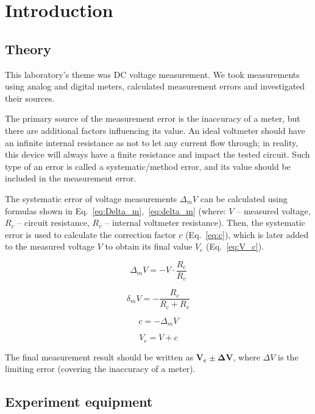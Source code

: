 \section{Introduction}

\subsection{Theory}

This laboratory's theme was DC voltage measurement. We took measurements using analog and digital meters, calculated measurement errors and investigated their sources.

The primary source of the measurement error is the inaccuracy of a meter, but there are additional factors influencing its value. An ideal voltmeter should have an infinite internal resistance as not to let any current flow through; in reality, this device will always have a finite resistance and impact the tested circuit. Such type of an error is called a systematic/method error, and its value should be included in the measurement error.

The systematic error of voltage measurements $\Delta_m V$ can be calculated using formulas shown in Eq.~\ref{eq:Delta_m},~\ref{eq:delta_m} (where: $V$ -- measured voltage, $R_c$ -- circuit resistance, $R_v$ -- internal voltmeter resistance). Then, the systematic error is used to calculate the correction factor $c$ (Eq.~\ref{eq:c}), which is later added to the measured voltage $V$ to obtain its final value $V_c$ (Eq.~\ref{eq:V_c}).

\begin{equation}
	\Delta_m V = -V\cdot\frac{R_c}{R_v}
	\label{eq:Delta_m}
\end{equation}

\begin{equation}
	\delta_m V = -\frac{R_c}{R_c + R_v}
	\label{eq:delta_m}
\end{equation}

\begin{equation}
	c = -\Delta_m V
	\label{eq:c}
\end{equation}

\begin{equation}
	V_c = V + c
	\label{eq:V_c}
\end{equation}

The final measurement result should be written as $\mathbf{V_c \pm \Delta V}$, where $\Delta V$ is the limiting error (covering the inaccuracy of a meter).

\subsection{Experiment equipment}

